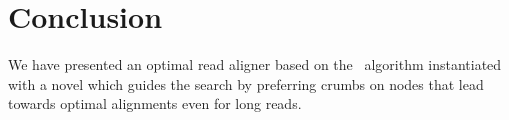 \section{Conclusion}
%
We have presented an optimal read aligner based on the \A~algorithm instantiated
with a novel \seedh which guides the search by preferring crumbs on nodes that lead
towards optimal alignments even for long reads.
